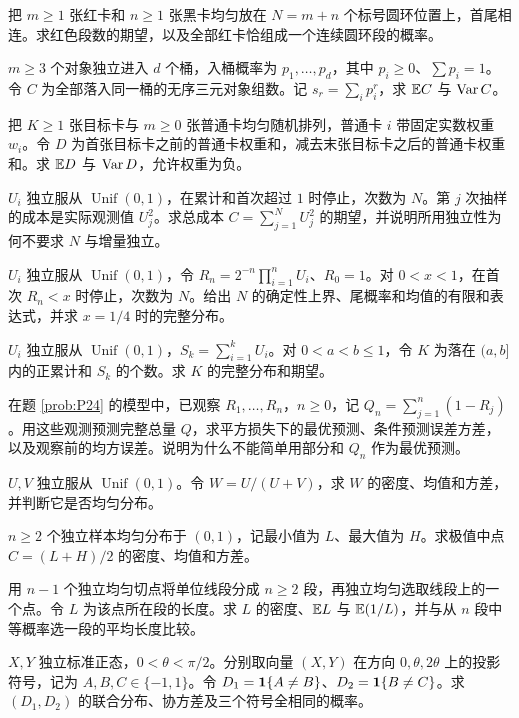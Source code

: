 把 $m\ge1$ 张红卡和 $n\ge1$ 张黑卡均匀放在 $N=m+n$ 个标号圆环位置上，首尾相连。求红色段数的期望，以及全部红卡恰组成一个连续圆环段的概率。

$m\ge3$ 个对象独立进入 $d$ 个桶，入桶概率为 $p_1,\ldots,p_d$，其中 $p_i\ge0$、$\sum p_i=1$。令 $C$ 为全部落入同一桶的无序三元对象组数。记 $s_r=\sum_i p_i^r$，求 $\mathbb{E} C$ 与 $\operatorname{Var} C$。

把 $K\ge1$ 张目标卡与 $m\ge0$ 张普通卡均匀随机排列，普通卡 $i$ 带固定实数权重 $w_i$。令 $D$ 为首张目标卡之前的普通卡权重和，减去末张目标卡之后的普通卡权重和。求 $\mathbb{E} D$ 与 $\operatorname{Var} D$，允许权重为负。

$U_i$ 独立服从 $\operatorname{Unif}(0,1)$，在累计和首次超过 $1$ 时停止，次数为 $N$。第 $j$ 次抽样的成本是实际观测值 $U_j^2$。求总成本 $C=\sum_{j=1}^NU_j^2$ 的期望，并说明所用独立性为何不要求 $N$ 与增量独立。

$U_i$ 独立服从 $\operatorname{Unif}(0,1)$，令 $R_n=2^{-n}\prod_{i=1}^nU_i$、$R_0=1$。对 $0<x<1$，在首次 $R_n<x$ 时停止，次数为 $N$。给出 $N$ 的确定性上界、尾概率和均值的有限和表达式，并求 $x=1/4$ 时的完整分布。

$U_i$ 独立服从 $\operatorname{Unif}(0,1)$，$S_k=\sum_{i=1}^kU_i$。对 $0<a<b\le1$，令 $K$ 为落在 $(a,b]$ 内的正累计和 $S_k$ 的个数。求 $K$ 的完整分布和期望。

\pagebreak
{}
在题 \ref{prob:P24} 的模型中，已观察 $R_1,\ldots,R_n$，$n\ge0$，记 $Q_n=\sum_{j=1}^n(1-R_j)$。用这些观测预测完整总量 $Q$，求平方损失下的最优预测、条件预测误差方差，以及观察前的均方误差。说明为什么不能简单用部分和 $Q_n$ 作为最优预测。

$U,V$ 独立服从 $\operatorname{Unif}(0,1)$。令 $W=U/(U+V)$，求 $W$ 的密度、均值和方差，并判断它是否均匀分布。

$n\ge2$ 个独立样本均匀分布于 $(0,1)$，记最小值为 $L$、最大值为 $H$。求极值中点 $C=(L+H)/2$ 的密度、均值和方差。

用 $n-1$ 个独立均匀切点将单位线段分成 $n\ge2$ 段，再独立均匀选取线段上的一个点。令 $L$ 为该点所在段的长度。求 $L$ 的密度、$\mathbb{E} L$ 与 $\mathbb{E}(1/L)$，并与从 $n$ 段中等概率选一段的平均长度比较。

$X,Y$ 独立标准正态，$0<\theta<\pi/2$。分别取向量 $(X,Y)$ 在方向 $0,\theta,2\theta$ 上的投影符号，记为 $A,B,C\in\{-1,1\}$。令 $D_1=\mathbf{1}\{A\ne B\}$、$D_2=\mathbf{1}\{B\ne C\}$。求 $(D_1,D_2)$ 的联合分布、协方差及三个符号全相同的概率。
